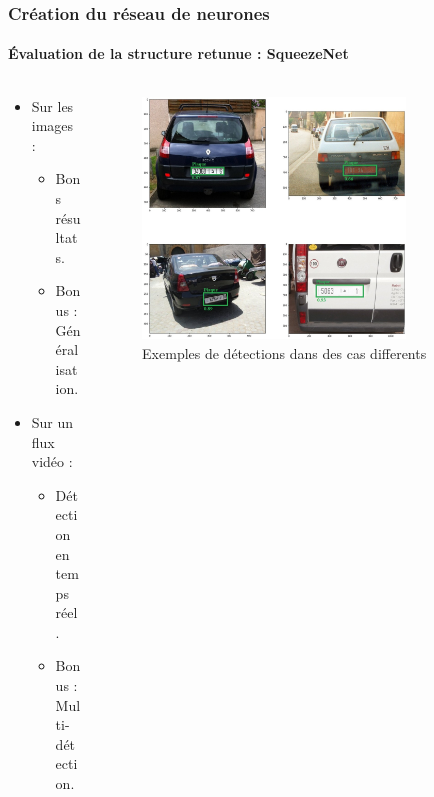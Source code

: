 \begin{frame}
\frametitle{Création du réseau de neurones}
\framesubtitle{Évaluation de la structure retunue : SqueezeNet}
\captionsetup{justification=centering}
\begin{columns}
\begin{column}{6cm}
    \begin{itemize}
    \item<1->   Sur les images :
    \begin{itemize}
        \item<1->   Bons résultats.
        \item<1->   Bonus : Généralisation.
    \end{itemize}
    \item<2->   Sur un flux vidéo :
        \begin{itemize}
            \item<2->   Détection en temps réel.
            \item<2->   Bonus : Multi-détection.
        \end{itemize}
    \end{itemize}
\end{column}
\begin{column}{6cm}
    \begin{figure}
        \begin{overprint}
        \captionsetup{justification=centering}
            \centering\includegraphics[width=0.8\textwidth]{figures/Eval.PNG}\caption{Exemples de détections dans des cas differents}

\end{overprint}
\end{figure}
\end{column}
\end{columns}
\end{frame}
